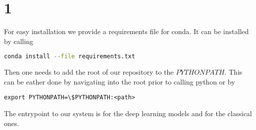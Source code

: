 \section{1}
For easy installation we provide a requirements file for conda. It can be installed by calling
\begin{lstlisting}[language=bash]
conda install --file requirements.txt 
\end{lstlisting}
Then one needs to add the root of our repository to the $PYTHONPATH$. This can be eather done by navigating into the root prior to calling python or by
\begin{lstlisting}
export PYTHONPATH=\$PYTHONPATH:<path>
\end{lstlisting}
The entrypoint to our system is  for the deep learning models and  for the classical ones.
